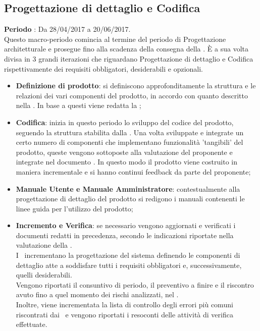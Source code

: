 \documentclass[../PianoDiProgetto.tex]{subfiles}
\begin{document}
		
		
		\subsection{Progettazione di dettaglio e Codifica}
		\textbf{Periodo} : Da 28/04/2017 a 20/06/2017. \\
		Questo macro-periodo comincia al termine del periodo di Progettazione architetturale e prosegue fino alla scadenza della consegna della \revisionediqualifica.
		È a sua volta divisa in 3 grandi iterazioni che riguardano Progettazione di dettaglio e Codifica rispettivamente dei requisiti obbligatori, desiderabili e opzionali.
		\begin{itemize}
			\item \textbf{Definizione di prodotto}: si definiscono approfonditamente la struttura e le relazioni dei vari componenti del prodotto, in accordo con quanto descritto nella \specificatecnica. In base a questi viene redatta la ;
			\item \textbf{Codifica}: inizia in questo periodo lo sviluppo del codice del prodotto, seguendo la struttura stabilita dalla . Una volta sviluppate e integrate un certo numero di componenti che implementano funzionalità 'tangibili' del prodotto, queste vengono sottoposte alla valutazione del proponente e integrate nel documento . In questo modo il prodotto viene costruito in maniera incrementale e si hanno continui feedback da parte del proponente;
			\item \textbf{Manuale Utente e Manuale Amministratore}: contestualmente alla progettazione di dettaglio del prodotto si redigono i manuali contenenti le linee guida per l'utilizzo del prodotto; 
			\item \textbf{Incremento e Verifica}: se necessario vengono aggiornati e verificati i documenti redatti in precedenza, secondo le indicazioni riportate nella valutazione della \revisionediprogettazione. \\
			I \progettisti\ incrementano la progettazione del sistema definendo le componenti di dettaglio atte a soddisfare tutti i requisiti obbligatori e, successivamente, quelli desiderabili. \\
			 Vengono riportati il consuntivo di periodo, il preventivo a finire e il riscontro avuto fino a quel momento dei rischi analizzati, nel \pianodiprogetto. \\  Inoltre, viene incrementata la lista di controllo degli errori più comuni riscontrati dai \verificatori\ e vengono riportati i resoconti delle attività di verifica effettuate.  
		\end{itemize}
\end{document}
